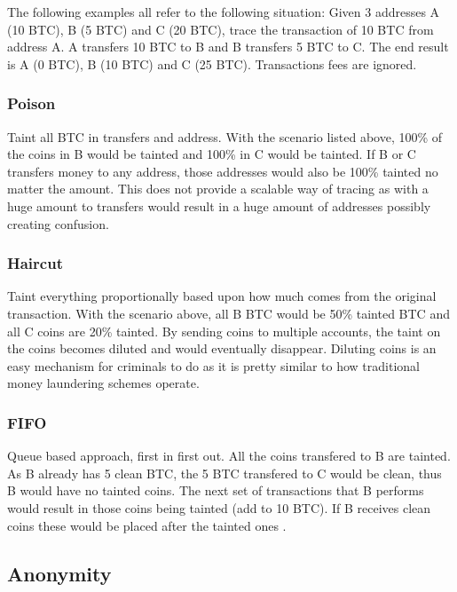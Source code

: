 \documentclass{article}
\begin{document}
The following examples all refer to the following situation: Given 3 addresses A (10 BTC), B (5 BTC) and C (20 BTC), trace the transaction of 10 BTC from address A. A transfers 10 BTC to B and B transfers 5 BTC to C. The end result is A (0 BTC), B (10 BTC) and C (25 BTC). Transactions fees are ignored.

\subsubsection{Poison}

Taint all BTC in transfers and address\cite{stolenbtc}. With the scenario listed above, 100\% of the coins in B would be tainted and 100\% in C would be tainted. If B or C transfers money to any address, those addresses would also be 100\% tainted no matter the amount. This does not provide a scalable way of tracing as with a huge amount to transfers would result in a huge amount of addresses possibly creating confusion.

\subsubsection{Haircut}

Taint everything proportionally based upon how much comes from the original transaction. With the scenario above, all B BTC would be 50\% tainted BTC and all C coins are 20\% tainted. By sending coins to multiple accounts, the taint on the coins becomes diluted and would eventually disappear\cite{stolenbtc}. Diluting coins is an easy mechanism for criminals to do as it is pretty similar to how traditional money laundering schemes operate.  
    
\subsubsection{FIFO}

Queue based approach, first in first out. All the coins transfered to B are tainted. As B already has 5 clean BTC, the 5 BTC transfered to C would be clean, thus B would have no tainted coins. The next set of transactions that B performs would result in those coins being tainted (add to 10 BTC). If B receives clean coins these would be placed after the tainted ones \cite{stolenbtc}.

\subsection{Anonymity}
\end{document}
